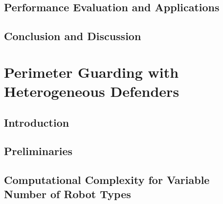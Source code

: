 \subsection{Performance Evaluation and Applications}\label{section:opg-evaluation}


\subsection{Conclusion and Discussion}\label{section:opg-conclusion}







\section{Perimeter Guarding with Heterogeneous Defenders}

\def\R{\mathcal R}
\def\C{\mathcal C}
\def\S{\mathcal S}
\def\P{\mathcal P}
\def\G{\mathcal G}
\def\W{\mathcal W}
\def\opg{{\sc {OPG}}\xspace}
\def\opglr{{\sc {OPG${}_{LR}$}}\xspace}
\def\opglrd{{\sc {D-OPG${}_{LR}$}}\xspace}
\def\opgmc{{\sc {OPG${}_{MC}$}}\xspace}

\newcommand{\argmin}[1]{\underset{#1}{\operatorname{arg}\,\operatorname{min}}\;}
\newcommand{\argmax}[1]{\underset{#1}{\operatorname{arg}\,\operatorname{max}}\;}

\def\twopart{\textbf{\textsc{Partition}}\xspace}
\def\tpart{\textbf{\textsc{$3$-Partition}}\xspace}
\def\ttkp{\textbf{\textsc{Knapsack}}\xspace}
\def\ttukp{\textbf{\textsc{Unbounded Knapsack}}\xspace}
\def\ttbp{\textbf{\textsc{Bin Packing}}\xspace}
\def\subsetsum{\textbf{\textsc{Subset Sum}}\xspace}

\subsection{Introduction}\label{sec:opgext-intro}


\subsection{Preliminaries}\label{sec:opgext-problem}


\subsection{Computational Complexity for Variable Number of Robot Types}\label{sec:opgext-hardness}


